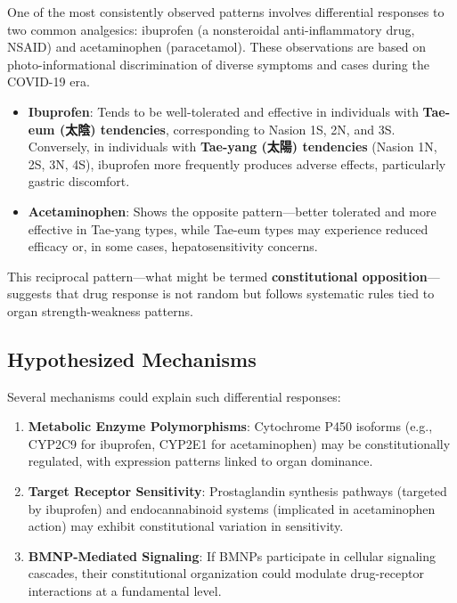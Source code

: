 \documentclass[12pt,a4paper]{article}
\begin{document}
One of the most consistently observed patterns involves differential responses to two common analgesics: ibuprofen (a nonsteroidal anti-inflammatory drug, NSAID) and acetaminophen (paracetamol). These observations are based on photo-informational discrimination of diverse symptoms and cases during the COVID-19 era.

\begin{itemize}
    \item \textbf{Ibuprofen}: Tends to be well-tolerated and effective in individuals with \textbf{Tae-eum (太陰) tendencies}, corresponding to Nasion 1S, 2N, and 3S. Conversely, in individuals with \textbf{Tae-yang (太陽) tendencies} (Nasion 1N, 2S, 3N, 4S), ibuprofen more frequently produces adverse effects, particularly gastric discomfort.
    
    \item \textbf{Acetaminophen}: Shows the opposite pattern—better tolerated and more effective in Tae-yang types, while Tae-eum types may experience reduced efficacy or, in some cases, hepatosensitivity concerns.
\end{itemize}

This reciprocal pattern—what might be termed \textbf{constitutional opposition}—suggests that drug response is not random but follows systematic rules tied to organ strength-weakness patterns.

\subsection{Hypothesized Mechanisms}

Several mechanisms could explain such differential responses:

\begin{enumerate}
    \item \textbf{Metabolic Enzyme Polymorphisms}: Cytochrome P450 isoforms (e.g., CYP2C9 for ibuprofen, CYP2E1 for acetaminophen) may be constitutionally regulated, with expression patterns linked to organ dominance.
    
    \item \textbf{Target Receptor Sensitivity}: Prostaglandin synthesis pathways (targeted by ibuprofen) and endocannabinoid systems (implicated in acetaminophen action) may exhibit constitutional variation in sensitivity.
    
    \item \textbf{BMNP-Mediated Signaling}: If BMNPs participate in cellular signaling cascades, their constitutional organization could modulate drug-receptor interactions at a fundamental level.
\end{enumerate}
\end{document}
